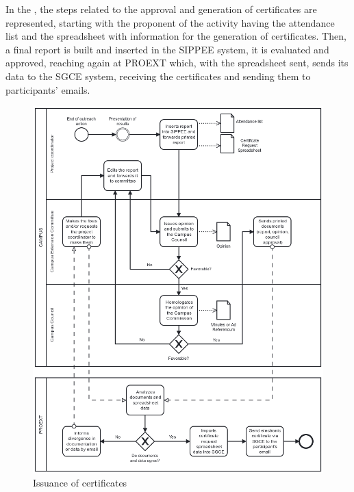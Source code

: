 
In the , the steps related to the approval and generation of certificates are represented, starting with the proponent of the activity having the attendance list and the spreadsheet with information for the generation of certificates. 
Then, a final report is built and inserted in the \ac{SIPPEE} system, it is evaluated and approved, reaching again at \ac{PROEXT} which, with the spreadsheet sent, sends its data to the \ac{SGCE} system, receiving the certificates and sending them to participants' emails.

\begin{figure}[htb]
  \caption{Issuance of certificates}\label{fig:issuance-certificates}
  \begin{center}
    \includegraphics[width=16cm]{img/3-emissao-de-certificados.png}
  \end{center}
\end{figure}

